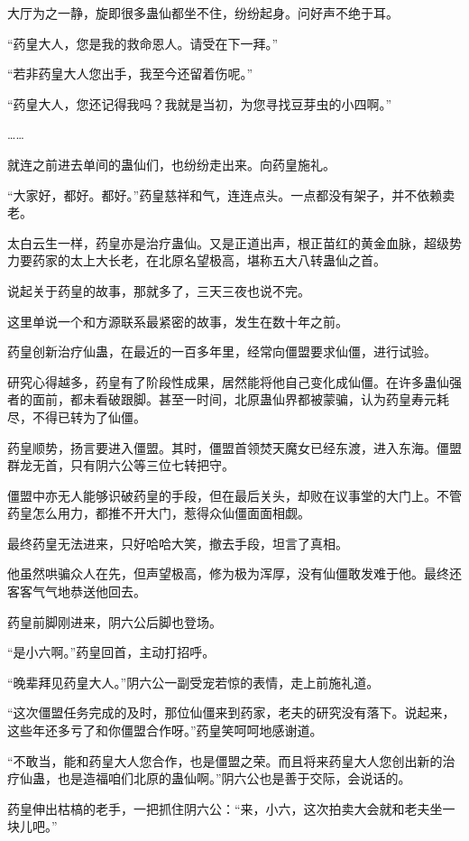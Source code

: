 \begin{this_body}
大厅为之一静，旋即很多蛊仙都坐不住，纷纷起身。问好声不绝于耳。

“药皇大人，您是我的救命恩人。请受在下一拜。”

“若非药皇大人您出手，我至今还留着伤呢。”

“药皇大人，您还记得我吗？我就是当初，为您寻找豆芽虫的小四啊。”

……

就连之前进去单间的蛊仙们，也纷纷走出来。向药皇施礼。

“大家好，都好。都好。”药皇慈祥和气，连连点头。一点都没有架子，并不依赖卖老。

太白云生一样，药皇亦是治疗蛊仙。又是正道出声，根正苗红的黄金血脉，超级势力要药家的太上大长老，在北原名望极高，堪称五大八转蛊仙之首。

说起关于药皇的故事，那就多了，三天三夜也说不完。

这里单说一个和方源联系最紧密的故事，发生在数十年之前。

药皇创新治疗仙蛊，在最近的一百多年里，经常向僵盟要求仙僵，进行试验。

研究心得越多，药皇有了阶段性成果，居然能将他自己变化成仙僵。在许多蛊仙强者的面前，都未看破跟脚。甚至一时间，北原蛊仙界都被蒙骗，认为药皇寿元耗尽，不得已转为了仙僵。

药皇顺势，扬言要进入僵盟。其时，僵盟首领焚天魔女已经东渡，进入东海。僵盟群龙无首，只有阴六公等三位七转把守。

僵盟中亦无人能够识破药皇的手段，但在最后关头，却败在议事堂的大门上。不管药皇怎么用力，都推不开大门，惹得众仙僵面面相觑。

最终药皇无法进来，只好哈哈大笑，撤去手段，坦言了真相。

他虽然哄骗众人在先，但声望极高，修为极为浑厚，没有仙僵敢发难于他。最终还客客气气地恭送他回去。

药皇前脚刚进来，阴六公后脚也登场。

“是小六啊。”药皇回首，主动打招呼。

“晚辈拜见药皇大人。”阴六公一副受宠若惊的表情，走上前施礼道。

“这次僵盟任务完成的及时，那位仙僵来到药家，老夫的研究没有落下。说起来，这些年还多亏了和你僵盟合作呀。”药皇笑呵呵地感谢道。

“不敢当，能和药皇大人您合作，也是僵盟之荣。而且将来药皇大人您创出新的治疗仙蛊，也是造福咱们北原的蛊仙啊。”阴六公也是善于交际，会说话的。

药皇伸出枯槁的老手，一把抓住阴六公：“来，小六，这次拍卖大会就和老夫坐一块儿吧。”


\end{this_body}
